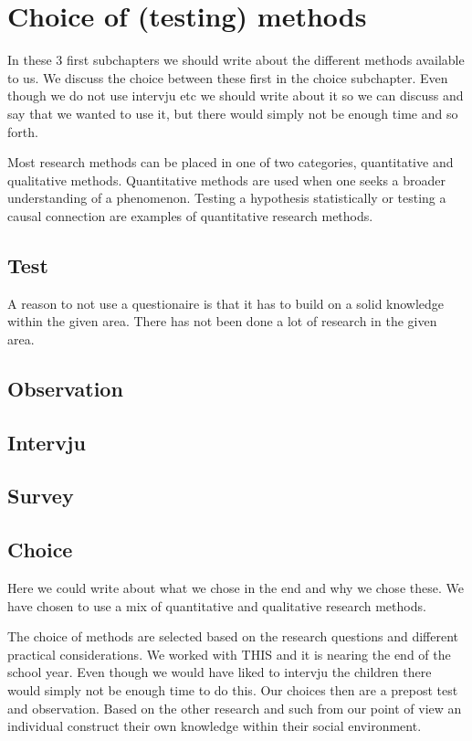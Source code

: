 \chapter{Choice of (testing) methods}
In these 3 first subchapters we should write about the different methods available to us. We discuss the choice between these first in the choice subchapter. Even though we do not use intervju etc we should write about it so we can discuss and say that we wanted to use it, but there would simply not be enough time and so forth.

Most research methods can be placed in one of two categories, quantitative and qualitative methods. Quantitative methods are used when one seeks a broader understanding of a phenomenon. Testing a hypothesis statistically or testing a causal connection are examples of quantitative research methods. 

\section{Test}
A reason to not use a questionaire is that it has to build on a solid knowledge within the given area. There has not been done a lot of research in the given area. 

\section{Observation}
\section{Intervju}
\section{Survey}
\section{Choice}
Here we could write about what we chose in the end and why we chose these. We have chosen to use a mix of quantitative and qualitative research methods.

The choice of methods are selected based on the research questions and different practical considerations. We worked with THIS and it is nearing the end of the school year. Even though we would have liked to intervju the children there would simply not be enough time to do this. Our choices then are a prepost test and observation. Based on the other research and such from our point of view an individual construct their own knowledge within their social environment.

